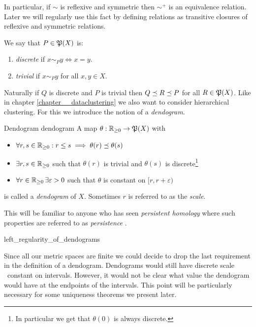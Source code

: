 In particular, if $\sim$ is reflexive and symmetric then $\sim^+$ is an equivalence relation.
Later we will regularly use this fact by defining relations as transitive closures of reflexive and symmetric relations.

\begin{definition}{}{}
We say that $P \in \P(X)$ is:
\begin{enumerate}
    \item \emph{discrete} if $x \sim_P y \iff x = y$.
    \item \emph{trivial} if $x \sim_P y$ for all $x,y \in X$.
\end{enumerate}
\end{definition}

Naturally if $Q$ is discrete and $P$ is trivial then $Q \refines R \refines P$ for all $R \in \P(X)$.
Like in chapter \ref{chapter__dataclustering} we also want to consider hierarchical clustering.
For this we introduce the notion of a \emph{dendogram}.

\begin{definition}{Dendogram \cite[Def.~2.2]{Carlsson2010}}{dendogram}
A map $\theta: \R_{\geq0} \to \mathfrak{P}(X)$ with
\begin{itemize}
    \item $\forall r,s \in \R_{\geq0}: r \leq s \implies  \theta(r) \refines \theta(s)$
    \item $\exists r,s \in \R_{\geq0}$ such that $\theta(r)$ is trivial and $\theta(s)$ is discrete\footnote{In particular we get that $\theta(0)$ is always discrete.}
    \item $\forall r \in \R_{\geq0} \,\exists \varepsilon > 0$ such that $\theta$ is constant on $[r, r + \varepsilon)$
\end{itemize}
is called a \emph{dendogram} of $X$. Sometimes $r$ is referred to as the \emph{scale}.
\end{definition}

This will be familiar to anyone who has seen \emph{persistent homology} where such properties are referred to as \emph{persistence} \cite[Chap.~3]{Carlsson2014}. 

\begin{myremark}{}{left_regularity_of_dendograms}

Since all our metric spaces are finite we could decide to drop the last requirement in the definition of a dendogram. Dendograms would still have discrete scale \ie\ constant on intervals.
However, it would not be clear what value the dendogram would have at the endpoints of the intervals.
This point will be particularly necessary for some uniqueness theorems we present later.
\end{myremark}

